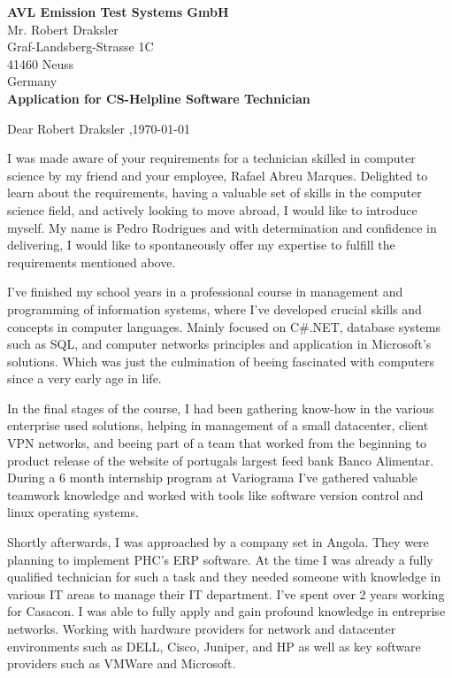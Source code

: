 \documentclass{letter}
\renewcommand*{\opening}[1]{\vspace{2\parskip}%
#1 \toname,\hfill\today\par\nobreak
}
\begin{document}
\begin{letter}{}

\textbf{AVL Emission Test Systems GmbH}\\
Mr. Robert Draksler\\
Graf-Landsberg-Strasse 1C\\
41460 Neuss\\
Germany\\

\textbf{Application for CS-Helpline Software Technician}

\opening{Dear Robert Draksler}


I was made aware of your requirements for a technician skilled in computer science by my friend and
your employee, Rafael Abreu Marques. Delighted to learn about the requirements, having a valuable
set of skills in the computer science field, and actively looking to move abroad, I would like to
introduce myself. My name is Pedro Rodrigues and with determination and confidence in delivering, I
would like to spontaneously offer my expertise to fulfill the requirements mentioned above.

I've finished my school years in a professional course in management and programming of information
systems, where I've developed crucial skills and concepts in computer languages. Mainly focused on
C\#.NET, database systems such as SQL, and computer networks principles and application in
Microsoft's solutions. Which was just the culmination of beeing fascinated with computers since a
very early age in life.

In the final stages of the course, I had been gathering know-how in the various enterprise used
solutions, helping in management of a small datacenter, client VPN networks, and beeing part of a
team that worked from the beginning to product release of the website of portugals largest feed
bank Banco Alimentar. During a 6 month internship program at Variograma I've gathered valuable
teamwork knowledge and worked with tools like software version control and linux operating systems.

Shortly afterwards, I was approached by a company set in Angola. They were planning to implement
PHC's ERP software. At the time I was already a fully qualified technician for such a task and they
needed someone with knowledge in various IT areas to manage their IT department. I've spent over 2
years working for Casacon. I was able to fully apply and gain profound knowledge in entreprise
networks. Working with hardware providers for network and datacenter environments such as DELL,
Cisco, Juniper, and HP as well as key software providers such as VMWare and Microsoft.


\end{letter}
\end{document}
